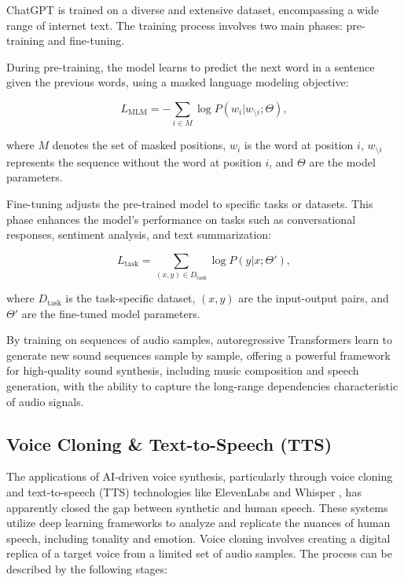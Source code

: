 \documentclass[11pt,a4paper,oneside]{report}
\begin{document}
ChatGPT is trained on a diverse and extensive dataset, encompassing a wide range of internet text. The training process involves two main phases: pre-training and fine-tuning.

During pre-training, the model learns to predict the next word in a sentence given the previous words, using a masked language modeling objective:

\begin{equation}
L_{\text{MLM}} = -\sum_{i \in M} \log P(w_i | w_{\setminus i}; \Theta),
\end{equation}

where $M$ denotes the set of masked positions, $w_i$ is the word at position $i$, $w_{\setminus i}$ represents the sequence without the word at position $i$, and $\Theta$ are the model parameters.

Fine-tuning adjusts the pre-trained model to specific tasks or datasets. This phase enhances the model's performance on tasks such as conversational responses, sentiment analysis, and text summarization:

\begin{equation}
L_{\text{task}} = \sum_{(x, y) \in D_{\text{task}}} \log P(y | x; \Theta'),
\end{equation}

where $D_{\text{task}}$ is the task-specific dataset, $(x, y)$ are the input-output pairs, and $\Theta'$ are the fine-tuned model parameters.

By training on sequences of audio samples, autoregressive Transformers learn to generate new sound sequences sample by sample, offering a powerful framework for high-quality sound synthesis, including music composition and speech generation, with the ability to capture the long-range dependencies characteristic of audio signals.

\subsection{Voice Cloning \& Text-to-Speech (TTS)}

The applications of AI-driven voice synthesis, particularly through voice cloning and text-to-speech (TTS) technologies like ElevenLabs \cite{elevenlabs} and Whisper \cite{OpenAIWhisper}, has apparently closed the gap between synthetic and human speech. 
These systems utilize deep learning frameworks to analyze and replicate the nuances of human speech, including tonality and emotion. 
Voice cloning involves creating a digital replica of a target voice from a limited set of audio samples. 
The process can be described by the following stages:
\end{document}
